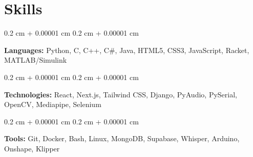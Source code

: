 \documentclass[10pt, letterpaper]{article}
\newenvironment{onecolentry}{
    \begin{adjustwidth}{
        0.2 cm + 0.00001 cm
    }{
        0.2 cm + 0.00001 cm
    }
}{
    \end{adjustwidth}
} %
\begin{document}
    \section{Skills}



        
        \begin{onecolentry}
            \textbf{Languages:} Python, C, C++, C\#, Java, HTML5, CSS3, JavaScript, Racket, MATLAB/Simulink
        \end{onecolentry}

        \vspace{0.1 cm}

        \begin{onecolentry}
            \textbf{Technologies:} React, Next.js, Tailwind CSS, Django, PyAudio, PySerial, OpenCV, Mediapipe, Selenium \end{onecolentry}

        \vspace{0.1 cm}

        \begin{onecolentry}
            \textbf{Tools:} Git, Docker, Bash, Linux, MongoDB, Supabase, Whisper, Arduino, Onshape, Klipper\end{onecolentry}
\end{document}
